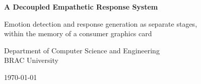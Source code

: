 \documentclass[12pt,a4paper,oneside]{report}
\begin{document}
\begin{titlepage}
\centering
\vspace*{1in}
{\LARGE\bfseries A Decoupled Empathetic Response System\par}
\vspace{0.4in}
{\large Emotion detection and response generation as separate stages,\\
within the memory of a consumer graphics card\par}
\vspace{0.8in}
{\large Department of Computer Science and Engineering\\
BRAC University\par}
\vspace{0.6in}
{\large \today\par}
\end{titlepage}

\tableofcontents
\listoffigures
\listoftables
\cleardoublepage











\end{document}
